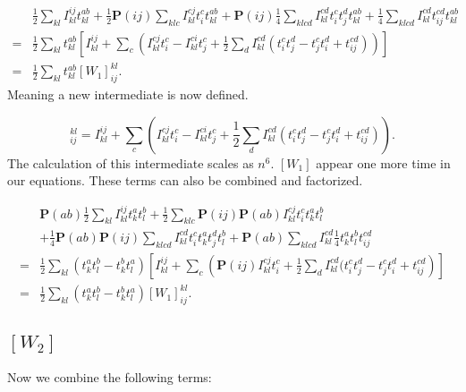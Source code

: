 \begin{align}
& 
\frac{1}{2} \sum_{kl} I_{kl}^{ij} t_{kl}^{ab} + \frac{1}{2} \textbf{P}(ij) \sum_{klc} I_{kl}^{cj} t_i^c t_{kl}^{ab} + \textbf{P}(ij) \frac{1}{4} \sum_{klcd} I_{kl}^{cd}  t_i^c t_j^d t_{kl}^{ab}
+ \frac{1}{4} \sum_{klcd} I_{kl}^{cd} t_{ij}^{cd} t_{kl}^{ab}
\nonumber \\ 
= &
\frac{1}{2} \sum_{kl} t_{kl}^{ab} \left[ I_{kl}^{ij} +  \sum_c \left(I_{kl}^{cj} t_i^c - I_{kl}^{ci} t_j^c + \frac{1}{2} \sum_{d}  I_{kl}^{cd} (t_i^c t_j^d - t_j^c t_i^d + t_{ij}^{cd})
 \right) \right]
\nonumber \\ 
= & \frac{1}{2} \sum_{kl} t_{kl}^{ab} [W_1]_{ij}^{kl} 
.
\end{align}
Meaning a new intermediate is now defined.

\begin{equation}
[W_1]^{kl}_{ij} = I_{kl}^{ij} +  \sum_c \left(I_{kl}^{cj} t_i^c - I_{kl}^{ci} t_j^c + \frac{1}{2} \sum_{d}  I_{kl}^{cd} (t_i^c t_j^d - t_j^c t_i^d + t_{ij}^{cd})
 \right) . \label{intermedw1}
\end{equation}
The calculation of this intermediate scales as $n^6$. $[W_1]$ appear one more time in our equations. These terms can also be combined and factorized.

\begin{align}
& \textbf{P}(ab) \frac{1}{2} \sum_{kl} I_{kl}^{ij} t_k^a t_l^b
+ \frac{1}{2} \sum_{klc} \textbf{P}(ij) \textbf{P}(ab) I_{kl}^{cj} t_i^c t_k^a t_l^b 
\nonumber \\ &
+ \frac{1}{4} \textbf{P}(ab) \textbf{P}(ij) \sum_{klcd} I_{kl}^{cd} t_i^c t_k^a t_j^d t_l^b
+ \textbf{P}(ab) \sum_{klcd} I_{kl}^{cd} \frac{1}{4} t_k^a t_l^b t_{ij}^{cd}
\nonumber \\ 
= &
\frac{1}{2} \sum_{kl} (t_k^a t_l^b - t_k^b t_l^a) \left[ I_{kl}^{ij} + \sum_c \left( \textbf{P}(ij) I_{kl}^{cj} t_i^c +
\frac{1}{2} \sum_d I_{kl}^{cd} ( t_i^c t_j^d - t_j^c t_i^d + t_{ij}^{cd}
\right) \right] \nonumber \\ 
= &
\frac{1}{2} \sum_{kl} (t_k^a t_l^b - t_k^b t_l^a) [W_1]_{ij}^{kl} .
\end{align}

\subsection{$[W_2]$}
Now we combine the following terms:

